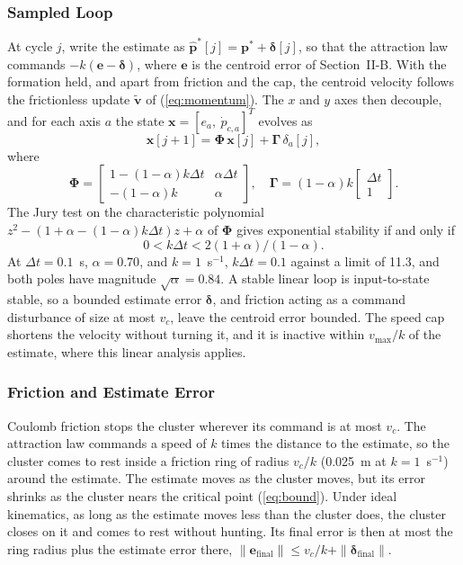 \documentclass[lettersize,journal]{IEEEtran}
\newcommand{\rev}[1]{#1}                             %
\begin{document}
\subsubsection{Sampled Loop}
At cycle $j$, write the estimate as $\hat{\mathbf{p}}^*[j] = \mathbf{p}^* + \boldsymbol{\delta}[j]$, so that the attraction law commands $-k(\mathbf{e} - \boldsymbol{\delta})$, where $\mathbf{e}$ is the centroid error of Section~II-B. With the formation held, and apart from friction and the cap, the centroid velocity follows the frictionless update $\tilde{\mathbf{v}}$ of (\ref{eq:momentum}). The $x$ and $y$ axes then decouple, and for each axis $a$ the state $\mathbf{x} = [e_a,\ \dot{p}_{c,a}]^T$ evolves as
\begin{equation}\label{eq:cl}
\mathbf{x}[j{+}1] = \boldsymbol{\Phi}\,\mathbf{x}[j] + \boldsymbol{\Gamma}\,\delta_a[j],
\end{equation}
where
\[
\boldsymbol{\Phi} = \begin{bmatrix} 1{-}(1{-}\alpha)k\Delta t & \alpha\Delta t \\ -(1{-}\alpha)k & \alpha \end{bmatrix}, \quad \boldsymbol{\Gamma} = (1{-}\alpha)k\begin{bmatrix}\Delta t\\ 1\end{bmatrix}.
\]
The Jury test on the characteristic polynomial $z^2 - (1 + \alpha - (1-\alpha)k\Delta t)z + \alpha$ of $\boldsymbol{\Phi}$ gives exponential stability if and only if
\begin{equation}\label{eq:kmax}
0 < k\Delta t < 2(1+\alpha)/(1-\alpha).
\end{equation}
At $\Delta t = 0.1$~s, $\alpha = 0.70$, and $k = 1$~s$^{-1}$, $k\Delta t = 0.1$ against a limit of \rev{11.3}, and both poles have magnitude $\sqrt{\alpha} = \rev{0.84}$. %
A stable linear loop is input-to-state stable, so a bounded estimate error $\boldsymbol{\delta}$, and friction acting as a command disturbance of size at most $v_c$, leave the centroid error bounded. The speed cap shortens the velocity without turning it, and it is inactive within $v_{\max}/k$ of the estimate, where this linear analysis applies.

\subsubsection{Friction and Estimate Error}
Coulomb friction stops the cluster wherever its command is at most $v_c$. The attraction law commands a speed of $k$ times the distance to the estimate, so the cluster comes to rest inside a friction ring of radius $v_c/k$ (0.025~m at $k = 1$~s$^{-1}$) around the estimate. The estimate moves as the cluster moves, but its error shrinks as the cluster nears the critical point (\ref{eq:bound}). Under ideal kinematics, as long as the estimate moves less than the cluster does, the cluster closes on it and comes to rest without hunting. Its final error is then at most the ring radius plus the estimate error there, $\|\mathbf{e}_{\text{final}}\| \le v_c/k + \|\boldsymbol{\delta}_{\text{final}}\|$.
\end{document}
